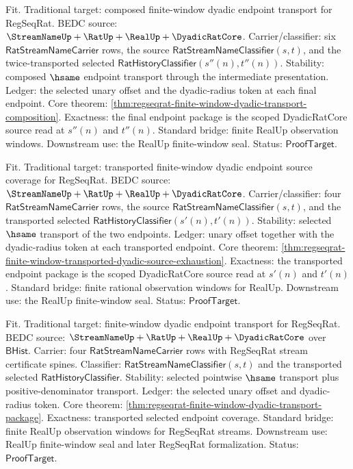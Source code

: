 Fit. Traditional target: composed finite-window dyadic endpoint transport for
RegSeqRat. BEDC source:
$\StreamNameUp+\RatUp+\RealUp+\DyadicRatCore$. Carrier/classifier: six
$\mathsf{RatStreamNameCarrier}$ rows, the source
$\mathsf{RatStreamNameClassifier}(s,t)$, and the twice-transported selected
$\mathsf{RatHistoryClassifier}(s''(n),t''(n))$. Stability: composed
$\hsame$ endpoint transport through the intermediate presentation. Ledger:
the selected unary offset and the dyadic-radius token at each final endpoint.
Core theorem:
\autoref{thm:regseqrat-finite-window-dyadic-transport-composition}.
Exactness: the final endpoint package is the scoped DyadicRatCore source read
at $s''(n)$ and $t''(n)$. Standard bridge: finite RealUp observation windows.
Downstream use: the RealUp finite-window seal. Status:
$\mathsf{ProofTarget}$.

Fit. Traditional target: transported finite-window dyadic endpoint source
coverage for RegSeqRat. BEDC source:
$\StreamNameUp+\RatUp+\RealUp+\DyadicRatCore$. Carrier/classifier: four
$\mathsf{RatStreamNameCarrier}$ rows, the source
$\mathsf{RatStreamNameClassifier}(s,t)$, and the transported selected
$\mathsf{RatHistoryClassifier}(s'(n),t'(n))$. Stability: selected
$\hsame$ transport of the two endpoints. Ledger: unary offset together with
the dyadic-radius token at each transported endpoint. Core theorem:
\autoref{thm:regseqrat-finite-window-transported-dyadic-source-exhaustion}.
Exactness: the transported endpoint package is the scoped DyadicRatCore source
read at $s'(n)$ and $t'(n)$. Standard bridge: finite rational observation
windows for RealUp. Downstream use: the RealUp finite-window seal.
Status: $\mathsf{ProofTarget}$.

Fit. Traditional target: finite-window dyadic endpoint transport for
RegSeqRat. BEDC source: $\StreamNameUp+\RatUp+\RealUp+\DyadicRatCore$ over
$\mathsf{BHist}$. Carrier: four $\mathsf{RatStreamNameCarrier}$ rows with
RegSeqRat stream certificate spines. Classifier:
$\mathsf{RatStreamNameClassifier}(s,t)$ and the transported selected
$\mathsf{RatHistoryClassifier}$. Stability: selected pointwise $\hsame$
transport plus positive-denominator transport. Ledger: the selected unary
offset and dyadic-radius token. Core theorem:
\autoref{thm:regseqrat-finite-window-dyadic-transport-package}. Exactness:
transported selected endpoint coverage. Standard bridge: finite RealUp
observation windows for RegSeqRat streams. Downstream use: RealUp
finite-window seal and later RegSeqRat formalization. Status:
$\mathsf{ProofTarget}$.
